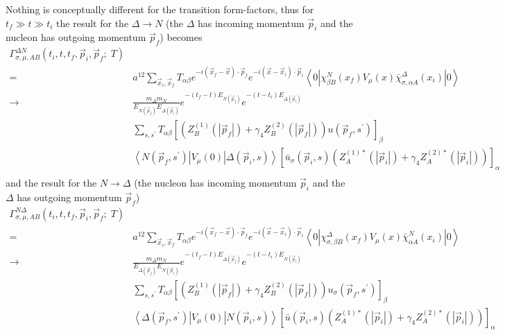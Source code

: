 \documentclass[12pt]{article}
\begin{document}
Nothing is conceptually different for the transition form-factors, thus for 
$t_f\gg t\gg t_i$ the result for the $\Delta\rightarrow N$ (the $\Delta$
has incoming momentum $\vec{p}_i$ and the nucleon has outgoing momentum $\vec{p}_f$)
becomes
\begin{equation}
\begin{split}
\Gamma^{\Delta N}_{\sigma,\mu,AB}(t_i,t,t_f,\vec{p}_i,\vec{p}_f;\;T) &\\
  =\ & a^{12}\sum_{\vec{x}_i,\vec{x}_f} T_{\alpha\beta} 
     e^{-i(\vec{x}_f-\vec{x})\cdot\vec{p}_f}
     e^{-i(\vec{x}-\vec{x}_i)\cdot\vec{p}_i}
     \left<0\left|\chi^N_{\beta B}(x_f)V_\mu(x)\bar\chi^\Delta_{\sigma,\alpha A}(x_i)
     \right|0\right> \\
\to& \frac{m_\Delta m_N}{E_{N(\vec{p}_f)}E_{\Delta(\vec{p}_i)}}
     e^{-(t_f-t)E_{N(\vec{p}_f)}}e^{-(t-t_i)E_{\Delta(\vec{p}_i)}} \\
  &  \sum_{s,s^\prime}  T_{\alpha\beta} 
     \left[\left(Z_B^{(1)}(|\vec{p}_f|)+\gamma_4Z_B^{(2)}(|\vec{p}_f|)\right)
     u(\vec{p}_f,s^\prime)\right]_\beta \\
  &  \left<N(\vec{p}_f,s^\prime)\left|V_\mu(0)\right|\Delta(\vec{p}_i,s)\right>
     \left[\bar{u}_\sigma(\vec{p}_i,s)
     \left(Z_A^{(1)*}(|\vec{p}_i|)+\gamma_4Z_A^{(2)*}(|\vec{p}_i|)\right)
     \right]_\alpha \\
\end{split}
\label{deltap3point}
\end{equation}
and the result for the $N\rightarrow\Delta$ (the nucleon
has incoming momentum $\vec{p}_i$ and the $\Delta$ has outgoing momentum $\vec{p}_f$)
\begin{equation}
\begin{split}
\Gamma^{N \Delta}_{\sigma,\mu,AB}(t_i,t,t_f,\vec{p}_i,\vec{p}_f;\;T) &\\
  =\ & a^{12}\sum_{\vec{x}_i,\vec{x}_f} T_{\alpha\beta} 
     e^{-i(\vec{x}_f-\vec{x})\cdot\vec{p}_f}
     e^{-i(\vec{x}-\vec{x}_i)\cdot\vec{p}_i}
     \left<0\left|\chi^\Delta_{\sigma,\beta B}(x_f)V_\mu(x)\bar\chi^N_{\alpha A}(x_i)
     \right|0\right> \\
\to& \frac{m_\Delta m_N}{E_{\Delta(\vec{p}_f)}E_{N(\vec{p}_i)}}
     e^{-(t_f-t)E_{\Delta(\vec{p}_f)}}e^{-(t-t_i)E_{N(\vec{p}_i)}} \\
  &  \sum_{s,s^\prime}  T_{\alpha\beta} 
     \left[\left(Z_B^{(1)}(|\vec{p}_f|)+\gamma_4Z_B^{(2)}(|\vec{p}_f|)\right)
     u_\sigma(\vec{p}_f,s^\prime)\right]_\beta \\
  &  \left<\Delta(\vec{p}_f,s^\prime)\left|V_\mu(0)\right|N(\vec{p}_i,s)\right>
     \left[\bar{u}(\vec{p}_i,s)
     \left(Z_A^{(1)*}(|\vec{p}_i|)+\gamma_4Z_A^{(2)*}(|\vec{p}_i|)\right)
     \right]_\alpha \\
\end{split}
\label{pdelta3point}
\end{equation}
\end{document}
